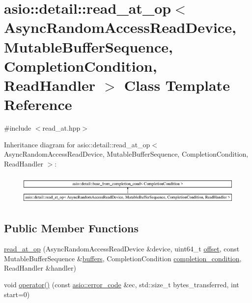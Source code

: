 \hypertarget{classasio_1_1detail_1_1read__at__op}{}\section{asio\+:\+:detail\+:\+:read\+\_\+at\+\_\+op$<$ Async\+Random\+Access\+Read\+Device, Mutable\+Buffer\+Sequence, Completion\+Condition, Read\+Handler $>$ Class Template Reference}
\label{classasio_1_1detail_1_1read__at__op}


{\ttfamily \#include $<$read\+\_\+at.\+hpp$>$}

Inheritance diagram for asio\+:\+:detail\+:\+:read\+\_\+at\+\_\+op$<$ Async\+Random\+Access\+Read\+Device, Mutable\+Buffer\+Sequence, Completion\+Condition, Read\+Handler $>$\+:\begin{figure}[H]
\begin{center}
\leavevmode
\includegraphics[height=1.562064cm]{classasio_1_1detail_1_1read__at__op}
\end{center}
\end{figure}
\subsection*{Public Member Functions}
\begin{DoxyCompactItemize}
\item 
\hyperlink{classasio_1_1detail_1_1read__at__op_af5cf9ad0aad6944248a1dbaf9d7d2438}{read\+\_\+at\+\_\+op} (Async\+Random\+Access\+Read\+Device \&device, uint64\+\_\+t \hyperlink{group__async__read__at_ga8dcdb41a4adfd6fe5322b5dd666d9f29}{offset}, const Mutable\+Buffer\+Sequence \&\hyperlink{group__async__read_ga54dede45c3175148a77fe6635222c47d}{buffers}, Completion\+Condition \hyperlink{group__async__read_gae2e215d5013596cc2b385bb6c13fa518}{completion\+\_\+condition}, Read\+Handler \&handler)
\item 
void \hyperlink{classasio_1_1detail_1_1read__at__op_a126728b8b47ee00aaf8bfcc5d3e9ce39}{operator()} (const \hyperlink{classasio_1_1error__code}{asio\+::error\+\_\+code} \&ec, std\+::size\+\_\+t bytes\+\_\+transferred, int start=0)
\end{DoxyCompactItemize}
